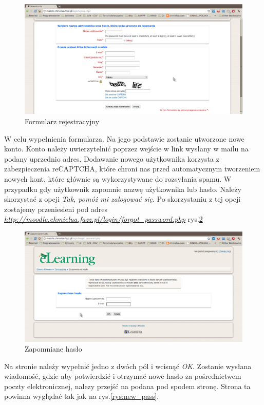 \begin{figure}[!h]
	\centering
		\caption{Formularz rejestracyjny} \label{rys:signup}
		\includegraphics[width=1\textwidth]{projekt_sys//rys//rejestracja.eps}
\end{figure}
W celu wypełnienia formularza. Na jego podstawie zostanie utworzone nowe konto. Konto należy uwierzytelnić poprzez wejście w link wysłany w mailu na podany uprzednio adres. Dodawanie nowego użytkownika korzysta z zabezpieczenia reCAPTCHA, które chroni nas przed automatycznym tworzeniem nowych kont, które głównie są wykorzystywane do rozsyłania spamu. W przypadku gdy użytkownik zapomnie nazwę użytkownika lub hasło. Należy skorzystać z opcji \textit{Tak, pomóż mi zalogować się}. Po skorzystaniu z tej opcji zostajemy przeniesieni pod adres \href{http://moodle.chmielua.fazz.pl/login/forgot_password.php}{\textit{http://moodle.chmielua.fazz.pl/login/forgot\_password.php}} rys.\ref{rys:lost_pass}
\begin{figure}[!h]
	\centering
		\caption{Zapomniane hasło} \label{rys:lost_pass}
		\includegraphics[width=1\textwidth]{projekt_sys//rys//lost_pass.eps}
\end{figure}
Na stronie należy wypełnić jedno z dwóch pól i wcisnąć \textit{OK}. Zostanie wysłana wiadomość, gdzie aby potwierdzić i otrzymać nowe hasło za pośrednictwem poczty elektronicznej, nalezy przejść na podana pod spodem stronę. Strona ta powinna wyglądać tak jak na rys.\ref{rys:new_pass}.
